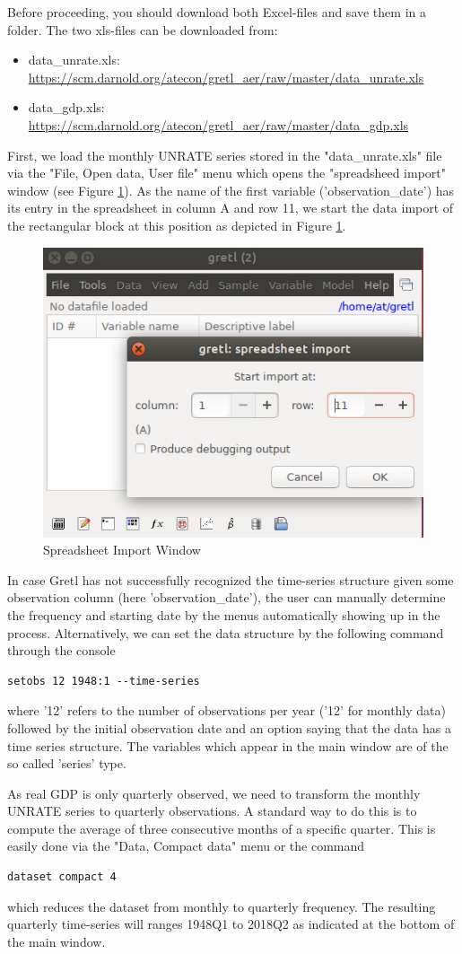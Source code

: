 \documentclass[11pt]{article}
\begin{document}
Before proceeding, you should download both Excel-files and save them in a folder. The two xls-files can be downloaded from:
\begin{itemize}
	\item data\_unrate.xls: \url{https://scm.darnold.org/atecon/gretl_aer/raw/master/data_unrate.xls}
	\item data\_gdp.xls: \url{https://scm.darnold.org/atecon/gretl_aer/raw/master/data_gdp.xls}
\end{itemize}

First, we load the monthly UNRATE series stored in the "data\_unrate.xls" file via the "File, Open data, User file" menu which opens the "spreadsheed import" window (see Figure \ref{fig:load}). As the name of the first variable ('observation\_date') has its entry in the spreadsheet in column A and row 11, we start the data import of the rectangular block at this position as depicted in Figure \ref{fig:load}.

\begin{figure}[!h]
	\centering
	\includegraphics[width=.42\textwidth]{../figures/open_file}
	\caption{Spreadsheet Import Window}
	\label{fig:load}
\end{figure}

In case Gretl has not successfully recognized the time-series structure given some observation column (here 'observation\_date'), the user can manually determine the frequency and starting date by the menus automatically showing up in the process. Alternatively, we can set the data structure by the following command through the console
\begin{verbatim}
setobs 12 1948:1 --time-series
\end{verbatim}
where '12' refers to the number of observations per year ('12' for monthly data) followed by the initial observation date and an option saying that the data has a time series structure. The variables which appear in the main window are of the so called 'series' type.

As real GDP is only quarterly observed, we need to transform the monthly UNRATE series to quarterly observations. A standard way to do this is to compute the average of three consecutive months of a specific quarter. This is easily done via the "Data, Compact data" menu or the command
\begin{verbatim}
dataset compact 4
\end{verbatim}
which reduces the dataset from monthly to quarterly frequency. The resulting quarterly time-series will ranges 1948Q1 to 2018Q2 as indicated at the bottom of the main window.
\end{document}
